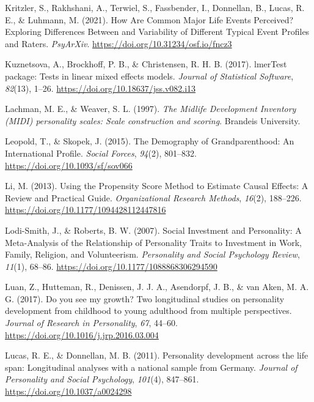 \documentclass[
  english,
  man, noextraspace]{apa7}
\begin{document}
\leavevmode\hypertarget{ref-kritzlerHowAreCommon2021}{}%
Kritzler, S., Rakhshani, A., Terwiel, S., Fassbender, I., Donnellan, B., Lucas, R. E., \& Luhmann, M. (2021). How Are Common Major Life Events Perceived? Exploring Differences Between and Variability of Different Typical Event Profiles and Raters. \emph{PsyArXiv}. \url{https://doi.org/10.31234/osf.io/fncz3}

\leavevmode\hypertarget{ref-R-lmerTest}{}%
Kuznetsova, A., Brockhoff, P. B., \& Christensen, R. H. B. (2017). lmerTest package: Tests in linear mixed effects models. \emph{Journal of Statistical Software}, \emph{82}(13), 1--26. \url{https://doi.org/10.18637/jss.v082.i13}

\leavevmode\hypertarget{ref-lachmanMidlifeDevelopmentInventory1997}{}%
Lachman, M. E., \& Weaver, S. L. (1997). \emph{The Midlife Development Inventory (MIDI) personality scales: Scale construction and scoring}. Brandeis University.

\leavevmode\hypertarget{ref-leopoldDemographyGrandparenthoodInternational2015}{}%
Leopold, T., \& Skopek, J. (2015). The Demography of Grandparenthood: An International Profile. \emph{Social Forces}, \emph{94}(2), 801--832. \url{https://doi.org/10.1093/sf/sov066}

\leavevmode\hypertarget{ref-liUsingPropensityScore2013}{}%
Li, M. (2013). Using the Propensity Score Method to Estimate Causal Effects: A Review and Practical Guide. \emph{Organizational Research Methods}, \emph{16}(2), 188--226. \url{https://doi.org/10.1177/1094428112447816}

\leavevmode\hypertarget{ref-lodi-smithSocialInvestmentPersonality2007}{}%
Lodi-Smith, J., \& Roberts, B. W. (2007). Social Investment and Personality: A Meta-Analysis of the Relationship of Personality Traits to Investment in Work, Family, Religion, and Volunteerism. \emph{Personality and Social Psychology Review}, \emph{11}(1), 68--86. \url{https://doi.org/10.1177/1088868306294590}

\leavevmode\hypertarget{ref-luanYouSeeMy2017}{}%
Luan, Z., Hutteman, R., Denissen, J. J. A., Asendorpf, J. B., \& van Aken, M. A. G. (2017). Do you see my growth? Two longitudinal studies on personality development from childhood to young adulthood from multiple perspectives. \emph{Journal of Research in Personality}, \emph{67}, 44--60. \url{https://doi.org/10.1016/j.jrp.2016.03.004}

\leavevmode\hypertarget{ref-lucasPersonalityDevelopmentLife2011}{}%
Lucas, R. E., \& Donnellan, M. B. (2011). Personality development across the life span: Longitudinal analyses with a national sample from Germany. \emph{Journal of Personality and Social Psychology}, \emph{101}(4), 847--861. \url{https://doi.org/10.1037/a0024298}
\end{document}
